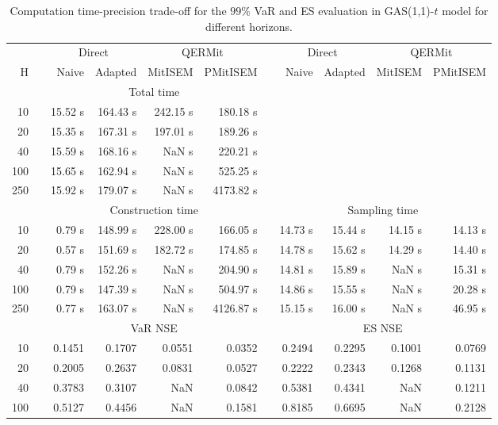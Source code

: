 { \renewcommand{\arraystretch}{1.3} 
\begin{table}[h] 
\centering 
\caption{Computation time-precision trade-off for the  $99\%$ VaR and ES evaluation in GAS(1,1)-$t$ model for different horizons.} 
\label{tab:time_precision_t_gas} 
\begin{tabular}{rr rrrr r rrrr}  
 & & \multicolumn{2}{c}{Direct} & \multicolumn{2}{c}{QERMit}&  & \multicolumn{2}{c}{Direct} & \multicolumn{2}{c}{QERMit} \\ \cline{3-6} \cline{8-11} 
 H & & Naive & Adapted & MitISEM & PMitISEM & & Naive & Adapted & MitISEM & PMitISEM \\ \hline 
 & & \multicolumn{4}{c}{Total time}  \\ \cline{3-6} 
10 & & 15.52 s & 164.43 s & 242.15 s & 180.18 s \\ 
20 & & 15.35 s & 167.31 s & 197.01 s & 189.26 s \\ 
40 & & 15.59 s & 168.16 s &  NaN s & 220.21 s \\ 
100 & & 15.65 s & 162.94 s &  NaN s & 525.25 s \\ 
250 & & 15.92 s & 179.07 s &  NaN s & 4173.82 s \\ 
\hline 
 & & \multicolumn{4}{c}{Construction time} & & \multicolumn{4}{c}{ Sampling time} \\ \cline{3-6}  \cline{8-11}
10 & & 0.79 s & 148.99 s & 228.00 s & 166.05 s && 14.73 s & 15.44 s & 14.15 s & 14.13 s \\ 
20 & & 0.57 s & 151.69 s & 182.72 s & 174.85 s && 14.78 s & 15.62 s & 14.29 s & 14.40 s \\ 
40 & & 0.79 s & 152.26 s &  NaN s & 204.90 s && 14.81 s & 15.89 s &  NaN s & 15.31 s \\ 
100 & & 0.79 s & 147.39 s &  NaN s & 504.97 s && 14.86 s & 15.55 s &  NaN s & 20.28 s \\ 
250 & & 0.77 s & 163.07 s &  NaN s & 4126.87 s && 15.15 s & 16.00 s &  NaN s & 46.95 s \\ 
\hline 
 & & \multicolumn{4}{c}{VaR NSE} &&  \multicolumn{4}{c}{ES NSE} \\ \cline{3-6}  \cline{8-11}
10 && 0.1451  & 0.1707  & 0.0551 & 0.0352 && 0.2494  & 0.2295  & 0.1001 & 0.0769 \\ 
20 && 0.2005  & 0.2637  & 0.0831 & 0.0527 && 0.2222  & 0.2343  & 0.1268 & 0.1131 \\ 
40 && 0.3783  & 0.3107  &    NaN & 0.0842 && 0.5381  & 0.4341  &    NaN & 0.1211 \\ 
100 && 0.5127  & 0.4456  &    NaN & 0.1581 && 0.8185  & 0.6695  &    NaN & 0.2128 \\ 

\end{tabular}
\end{table}}
